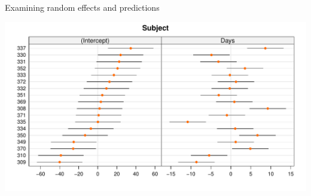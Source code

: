 \documentclass[aspectratio=169]{beamer}
\begin{document}
\begin{frame}[fragile]{Examining random effects and predictions}
  \begin{center}
    \includegraphics[scale=.6]{../figures/sleep_caterpillar}
  \end{center}
\end{frame}
\end{document}
